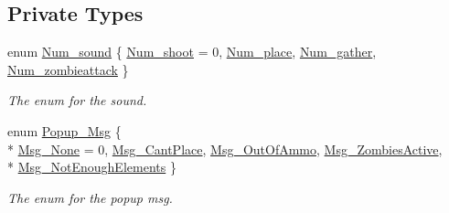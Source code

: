 \subsection*{Private Types}
\begin{DoxyCompactItemize}
\item 
enum \hyperlink{classoctet_1_1minecraft__wars_ac30cfc7ec58748224e1109e398522462}{Num\+\_\+sound} \{ \hyperlink{classoctet_1_1minecraft__wars_ac30cfc7ec58748224e1109e398522462ad12e509a5562df299a02b60456736c9c}{Num\+\_\+shoot} = 0, 
\hyperlink{classoctet_1_1minecraft__wars_ac30cfc7ec58748224e1109e398522462a13f24fe7cd8f02bf8ddb88d86fb0636a}{Num\+\_\+place}, 
\hyperlink{classoctet_1_1minecraft__wars_ac30cfc7ec58748224e1109e398522462a5dafe8fadc6f2962ad5c79cbd479a029}{Num\+\_\+gather}, 
\hyperlink{classoctet_1_1minecraft__wars_ac30cfc7ec58748224e1109e398522462a6e8de0b5836c4b4d830394c609538558}{Num\+\_\+zombieattack}
 \}
\begin{DoxyCompactList}\small\item\em The enum for the sound. \end{DoxyCompactList}\item 
enum \hyperlink{classoctet_1_1minecraft__wars_a5d719db7b0232a40272505d0c4e56281}{Popup\+\_\+\+Msg} \{ \\*
\hyperlink{classoctet_1_1minecraft__wars_a5d719db7b0232a40272505d0c4e56281ab2b8322b755a8de1fc36fdddb83b15f1}{Msg\+\_\+\+None} = 0, 
\hyperlink{classoctet_1_1minecraft__wars_a5d719db7b0232a40272505d0c4e56281aa6dc49c36638c439e751ed67a7f6e448}{Msg\+\_\+\+Cant\+Place}, 
\hyperlink{classoctet_1_1minecraft__wars_a5d719db7b0232a40272505d0c4e56281a0cb5aa2311cc9e37a7513fbb16aa0736}{Msg\+\_\+\+Out\+Of\+Ammo}, 
\hyperlink{classoctet_1_1minecraft__wars_a5d719db7b0232a40272505d0c4e56281a54ac09e884d29d2a2a38d28b9cefe558}{Msg\+\_\+\+Zombies\+Active}, 
\\*
\hyperlink{classoctet_1_1minecraft__wars_a5d719db7b0232a40272505d0c4e56281a8019823abc3ab3b35d217ca7366f7240}{Msg\+\_\+\+Not\+Enough\+Elements}
 \}
\begin{DoxyCompactList}\small\item\em The enum for the popup msg. \end{DoxyCompactList}\end{DoxyCompactItemize}
